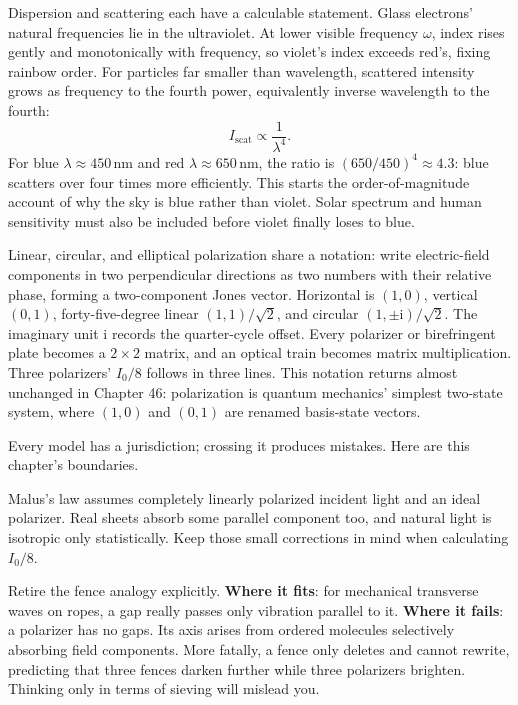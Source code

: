 \begin{mathbridge}
Dispersion and scattering each have a calculable statement. Glass electrons' natural frequencies lie in the ultraviolet. At lower visible frequency \(\omega\), index rises gently and monotonically with frequency, so violet's index exceeds red's, fixing rainbow order. For particles far smaller than wavelength, scattered intensity grows as frequency to the fourth power, equivalently inverse wavelength to the fourth:
\[
  I_{\text{scat}} \propto \frac{1}{\lambda^4}.
\]
For blue \(\lambda\approx 450\,\mathrm{nm}\) and red \(\lambda\approx 650\,\mathrm{nm}\), the ratio is \((650/450)^4\approx 4.3\): blue scatters over four times more efficiently. This starts the order-of-magnitude account of why the sky is blue rather than violet. Solar spectrum and human sensitivity must also be included before violet finally loses to blue.
\end{mathbridge}

\begin{challenge}
Linear, circular, and elliptical polarization share a notation: write electric-field components in two perpendicular directions as two numbers with their relative phase, forming a two-component Jones vector. Horizontal is \((1,0)\), vertical \((0,1)\), forty-five-degree linear \((1,1)/\sqrt{2}\), and circular \((1,\pm\mathrm{i})/\sqrt{2}\). The imaginary unit \(\mathrm{i}\) records the quarter-cycle offset. Every polarizer or birefringent plate becomes a \(2\times2\) matrix, and an optical train becomes matrix multiplication. Three polarizers' \(I_0/8\) follows in three lines. This notation returns almost unchanged in Chapter 46: polarization is quantum mechanics' simplest two-state system, where \((1,0)\) and \((0,1)\) are renamed basis-state vectors.
\end{challenge}


Every model has a jurisdiction; crossing it produces mistakes. Here are this chapter's boundaries.

Malus's law assumes completely linearly polarized incident light and an ideal polarizer. Real sheets absorb some parallel component too, and natural light is isotropic only statistically. Keep those small corrections in mind when calculating \(I_0/8\).

Retire the fence analogy explicitly. \textbf{Where it fits}: for mechanical transverse waves on ropes, a gap really passes only vibration parallel to it. \textbf{Where it fails}: a polarizer has no gaps. Its axis arises from ordered molecules selectively absorbing field components. More fatally, a fence only deletes and cannot rewrite, predicting that three fences darken further while three polarizers brighten. Thinking only in terms of sieving will mislead you.

